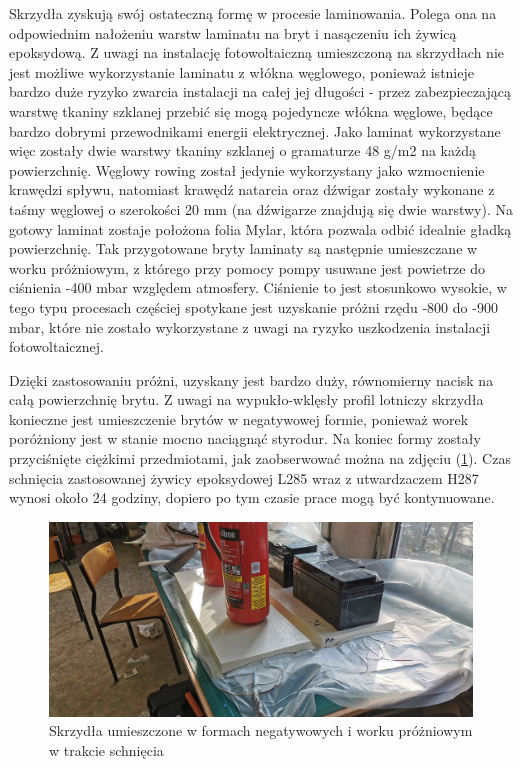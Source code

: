 \documentclass[12pt, a4paper]{article}
\let\oldref\ref
\renewcommand{\ref}[1]{(\oldref{#1})}
\begin{document}
Skrzydła zyskują swój ostateczną formę w procesie laminowania. Polega ona na odpowiednim nałożeniu warstw laminatu na bryt i nasączeniu ich żywicą epoksydową. Z uwagi na instalację fotowoltaiczną umieszczoną na skrzydłach nie jest możliwe wykorzystanie laminatu z włókna węglowego, ponieważ istnieje bardzo duże ryzyko zwarcia instalacji na całej jej długości - przez zabezpieczającą warstwę tkaniny szklanej przebić się mogą pojedyncze włókna węglowe, będące bardzo dobrymi przewodnikami energii elektrycznej. Jako laminat wykorzystane więc zostały dwie warstwy tkaniny szklanej o gramaturze 48 g/m2 na każdą powierzchnię. Węglowy rowing został jedynie wykorzystany jako wzmocnienie krawędzi spływu, natomiast krawędź natarcia oraz dźwigar zostały wykonane z taśmy węglowej o szerokości 20 mm (na dźwigarze znajdują się dwie warstwy). Na gotowy laminat zostaje położona folia Mylar, która pozwala odbić idealnie gładką powierzchnię. Tak przygotowane bryty laminaty są następnie umieszczane w worku próżniowym, z którego przy pomocy pompy usuwane jest powietrze do ciśnienia -400 mbar względem atmosfery. Ciśnienie to jest stosunkowo wysokie, w tego typu procesach częściej spotykane jest uzyskanie próżni rzędu -800 do -900 mbar, które nie zostało wykorzystane z uwagi na ryzyko uszkodzenia instalacji fotowoltaicznej.

Dzięki zastosowaniu próżni, uzyskany jest bardzo duży, równomierny nacisk na całą powierzchnię brytu. Z uwagi na wypukło-wklęsły profil lotniczy skrzydła konieczne jest umieszczenie brytów w negatywowej formie, ponieważ worek poróżniony jest w stanie mocno naciągnąć styrodur. Na koniec formy zostały przyciśnięte ciężkimi przedmiotami, jak zaobserwować można na zdjęciu \ref{fig:schniecie}. Czas schnięcia zastosowanej żywicy epoksydowej L285 wraz z utwardzaczem H287 wynosi około 24 godziny, dopiero po tym czasie prace mogą być kontynuowane.

 \begin{figure}[ht]
    \centering
    \includegraphics[width=1\textwidth]{budowa9}
    \caption{Skrzydła umieszczone w formach negatywowych i worku próżniowym w trakcie schnięcia}
    \label{fig:schniecie}
\end{figure}
\end{document}
